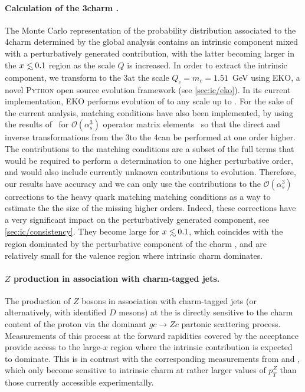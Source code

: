 \paragraph{Calculation of the 3\fns charm \pdf.}
%
The Monte Carlo representation of the probability distribution associated to
the 4\fns charm \pdf determined by the global
analysis contains an intrinsic component mixed with a perturbatively
generated contribution, with the latter
becoming larger in the $x\lsim 0.1$ region as the scale $Q$ is increased.
%
In order to extract the intrinsic component, 
we transform \pdfs to the 3\fns at the scale $Q_c=m_c=1.51$~GeV using
\textsc{\small EKO}, a novel \textsc{\small Python} open source
\pdf evolution framework (see  \cref{sec:ic/eko}).
%
In its current implementation, \textsc{\small EKO} performs  \qcd 
evolution of \pdfs to any scale
up to \nnlo. For
the sake of the current analysis, \nnnlo matching conditions have also
been implemented, by 
using  the results
of~\cite{Bierenbaum:2009zt,Bierenbaum:2009mv,Ablinger:2010ty,Ablinger:2014vwa,Ablinger:2014uka,Behring:2014eya,Ablinger_2014,Ablinger:2014nga,Blumlein:2017wxd}
for $\mathcal{O}(\alpha_s^3)$ operator matrix elements~
so that the direct and inverse transformations from the 3\fns to the
4\fns can be performed at one order
higher.
%
The \nnnlo contributions to the matching conditions are a subset of
the full \nnnlo terms that would be required to perform a \pdf determination
 to one higher perturbative order, and would
also include currently unknown
\nnnlo contributions to \qcd evolution. Therefore, our results have 
\nnlo accuracy and we can only use the  \nnnlo contributions to the
 $\mathcal{O}(\alpha_s^3)$ corrections to the
heavy quark matching
matching conditions as a way to estimate the 
the size of the missing higher orders. 
Indeed, these corrections have a very 
significant impact on the
perturbatively generated component, see \cref{sec:ic/consistency}.
%
They become large for $x \lsim 0.1$, which coincides with the region
dominated by the perturbative component of the charm \pdf,
  and are relatively small for the valence region
  where intrinsic charm dominates.
  
\paragraph{$Z$ production in association with charm-tagged jets.}
%
The production of $Z$ bosons in association with charm-tagged jets (or alternatively,
with identified $D$ mesons) at the \lhc is directly sensitive to the charm content
of the proton via the dominant $gc \to Zc$ partonic scattering process.
%
Measurements of this process at  the forward rapidities covered by the
\lhcb acceptance provide access to the large-$x$ region where the intrinsic 
contribution is expected to dominate.
%
This is in contrast with the corresponding measurements from \atlas and \cms,
which only become sensitive to intrinsic charm
at rather larger values of $p_T^Z$ than those
currently accessible experimentally.

